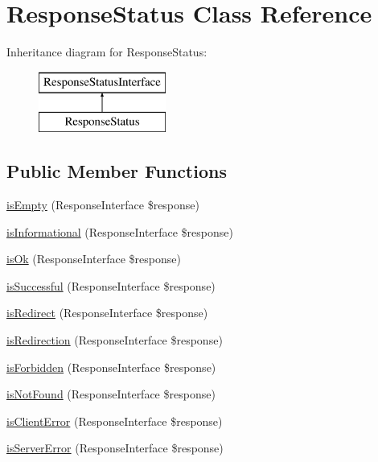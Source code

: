 \hypertarget{class_pes_1_1_http_1_1_response_status}{}\section{Response\+Status Class Reference}
\label{class_pes_1_1_http_1_1_response_status}
Inheritance diagram for Response\+Status\+:\begin{figure}[H]
\begin{center}
\leavevmode
\includegraphics[height=2.000000cm]{class_pes_1_1_http_1_1_response_status}
\end{center}
\end{figure}
\subsection*{Public Member Functions}
\begin{DoxyCompactItemize}
\item 
\mbox{\hyperlink{class_pes_1_1_http_1_1_response_status_a5166ac30ac60791ad8c30d76038b9371}{is\+Empty}} (Response\+Interface \$response)
\item 
\mbox{\hyperlink{class_pes_1_1_http_1_1_response_status_aefe91e716fcd58aed7eea5eade4b7cc0}{is\+Informational}} (Response\+Interface \$response)
\item 
\mbox{\hyperlink{class_pes_1_1_http_1_1_response_status_ab3105c65ed8a2617a4928f250dba979f}{is\+Ok}} (Response\+Interface \$response)
\item 
\mbox{\hyperlink{class_pes_1_1_http_1_1_response_status_ac9309d8cf733cca95b953596caeb3969}{is\+Successful}} (Response\+Interface \$response)
\item 
\mbox{\hyperlink{class_pes_1_1_http_1_1_response_status_af59c219f65321f33f460c22d5661b751}{is\+Redirect}} (Response\+Interface \$response)
\item 
\mbox{\hyperlink{class_pes_1_1_http_1_1_response_status_a5b211efda150fe422f2ae707392168d6}{is\+Redirection}} (Response\+Interface \$response)
\item 
\mbox{\hyperlink{class_pes_1_1_http_1_1_response_status_aa0084ca7689eec6f23e6ea5f30e228fa}{is\+Forbidden}} (Response\+Interface \$response)
\item 
\mbox{\hyperlink{class_pes_1_1_http_1_1_response_status_aef4db1f3ebf7e7ddcf51de3af3471713}{is\+Not\+Found}} (Response\+Interface \$response)
\item 
\mbox{\hyperlink{class_pes_1_1_http_1_1_response_status_a3f4db87c51272174be28176a2919633d}{is\+Client\+Error}} (Response\+Interface \$response)
\item 
\mbox{\hyperlink{class_pes_1_1_http_1_1_response_status_a231e10c5923247f27d4ce5ba6aaa7a97}{is\+Server\+Error}} (Response\+Interface \$response)
\end{DoxyCompactItemize}


